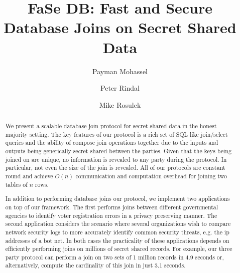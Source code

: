 \documentclass[11pt,letterpaper]{article}
\title{FaSe DB: Fast and Secure Database Joins on Secret Shared Data}
\author{Payman Mohassel \and Peter Rindal \and Mike Rosulek }
\begin{document}
\maketitle

\begin{abstract}
We present a scalable database join protocol for secret shared data in the honest majority setting. The key features of our protocol is a rich set of SQL like join/select queries and the ability of compose join operations together due to the inputs and outputs being generically secret shared between the parties. Given that the keys being joined on are unique, no information is revealed to any party during the protocol. In particular, not even the size of the join is revealed. All of our protocols are constant round and achieve $O(n)$ communication and computation overhead for joining two tables of $n$ rows. 

In addition to performing database joins our protocol, we implement two applications on top of our framework. The first performs joins between different governmental agencies to identify voter registration errors in a privacy preserving manner. The second application considers the scenario where several organizations wish to compare network security logs to more accurately identify common security threats, e.g. the ip addresses of a bot net. In both cases the practicality of these applications depends on efficiently performing joins on millions of secret shared records. For example, our three party protocol can perform a join on two sets of 1 million records in 4.9 seconds or, alternatively, compute the cardinality of this join in just 3.1 seconds. 
\end{abstract}


















\end{document}
